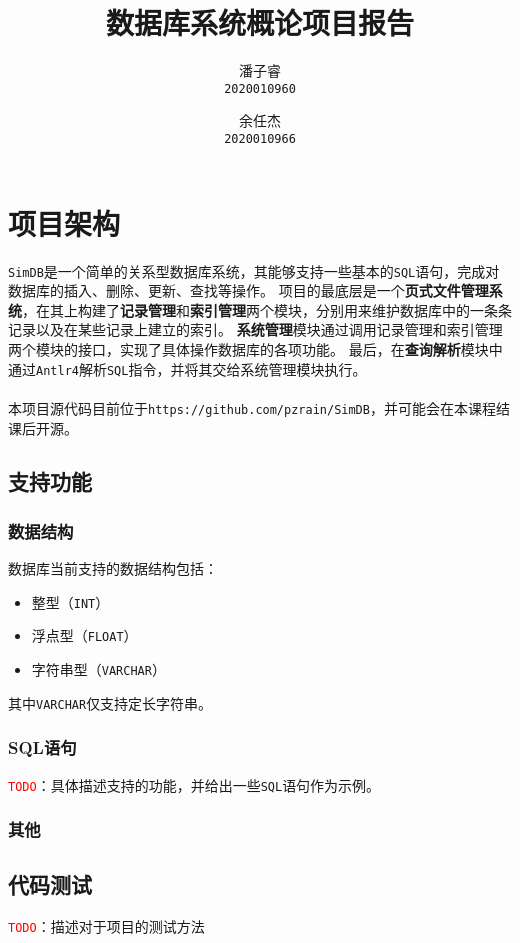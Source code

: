 \documentclass[11pt]{article}
\title{\textbf{数据库系统概论项目报告}}
\author{
    潘子睿\\
    \texttt{2020010960}
    \and
    余任杰\\
    \texttt{2020010966}
}
\begin{document}
\maketitle
\tableofcontents
\setlength{\parindent}{0pt}
\clearpage

\section{项目架构}
\texttt{SimDB}是一个简单的关系型数据库系统，其能够支持一些基本的\texttt{SQL}语句，完成对数据库的插入、删除、更新、查找等操作。
项目的最底层是一个\textbf{页式文件管理系统}，在其上构建了\textbf{记录管理}和\textbf{索引管理}两个模块，分别用来维护数据库中的一条条记录以及在某些记录上建立的索引。
\textbf{系统管理}模块通过调用记录管理和索引管理两个模块的接口，实现了具体操作数据库的各项功能。
最后，在\textbf{查询解析}模块中通过\texttt{Antlr4}解析\texttt{SQL}指令，并将其交给系统管理模块执行。\\\\
本项目源代码目前位于\texttt{https://github.com/pzrain/SimDB}，并可能会在本课程结课后开源。
\subsection{支持功能}
\subsubsection{数据结构}
数据库当前支持的数据结构包括：
\begin{itemize}
    \item 整型（\texttt{INT}）
    \item 浮点型（\texttt{FLOAT}）
    \item 字符串型（\texttt{VARCHAR}）
\end{itemize}
其中\texttt{VARCHAR}仅支持定长字符串。
\subsubsection{SQL语句}
\texttt{\textcolor{red}{TODO}}：具体描述支持的功能，并给出一些\texttt{SQL}语句作为示例。
\subsubsection{其他}
\subsection{代码测试}
\texttt{\textcolor{red}{TODO}}：描述对于项目的测试方法
\end{document}
